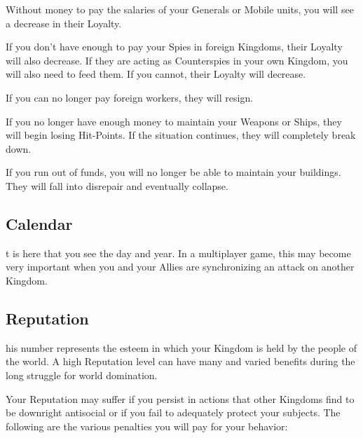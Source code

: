 Without money to pay the salaries of your Generals or Mobile units, you will see a decrease in their Loyalty.

If you don’t have enough to pay your Spies in foreign Kingdoms, their Loyalty will also decrease. If they are acting as Counterspies in your own Kingdom, you will also need to feed them. If you cannot, their Loyalty will decrease.

If you can no longer pay foreign workers, they will resign.

If you no longer have enough money to maintain your Weapons or Ships, they will begin losing Hit-Points. If the situation continues, they will completely break down.

If you run out of funds, you will no longer be able to maintain your buildings. They will fall into disrepair and eventually collapse.

\subsection{Calendar}


t is here that you see the day and year. In a multiplayer game, this may become very important when you and your Allies are synchronizing an attack on another Kingdom.

\subsection{Reputation}


his number represents the esteem in which your Kingdom is held by the people of the world. A high Reputation level can have many and varied benefits during the long struggle for world domination.

Your Reputation may suffer if you persist in actions that other Kingdoms find to be downright antisocial or if you fail to adequately protect your subjects. The following are the various penalties you will pay for your behavior:


